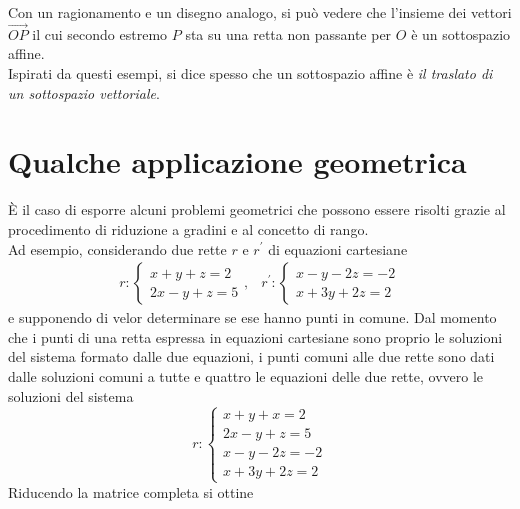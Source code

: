 \documentclass{book}
\theoremstyle{definition}
\theoremstyle{plain}
\begin{document}
Con un ragionamento e un disegno analogo, si può vedere che l'insieme dei vettori $\vec{OP}$ il cui
secondo estremo $P$ sta su una retta non passante per $O$ è un sottospazio affine.\\
Ispirati da questi esempi, si dice spesso che un sottospazio affine è \textit{il traslato di un
  sottospazio vettoriale}.

\section{Qualche applicazione geometrica}
\label{sec:qualcheappgeo}

È il caso di esporre alcuni problemi geometrici che possono essere risolti grazie al procedimento
di riduzione a gradini e al concetto di rango.\\
Ad esempio, considerando due rette $r$ e $r^\prime$ di equazioni cartesiane
\begin{eqnarray}
  \label{eq:qualcheappgeo1}
  r:
  \begin{cases}
    x+y+z=2\\
    2x-y+z=5
  \end{cases}, & r^\prime:
  \begin{cases}
    x-y-2z=-2\\
    x+3y+2z=2
  \end{cases}
\end{eqnarray}
e supponendo di velor determinare se ese hanno punti in comune. Dal momento che i punti di una retta
espressa in equazioni cartesiane sono proprio le soluzioni del sistema formato dalle due equazioni,
i punti comuni alle due rette sono dati dalle soluzioni comuni a tutte e quattro le equazioni delle
due rette, ovvero le soluzioni del sistema
\begin{equation}
  \label{eq:qualcheappgeo2}
  r:
  \begin{cases}
    x+y+x=2\\
    2x-y+z=5\\
    x-y-2z=-2\\
    x+3y+2z=2
  \end{cases}
\end{equation}
Riducendo la matrice completa si ottine
\end{document}
